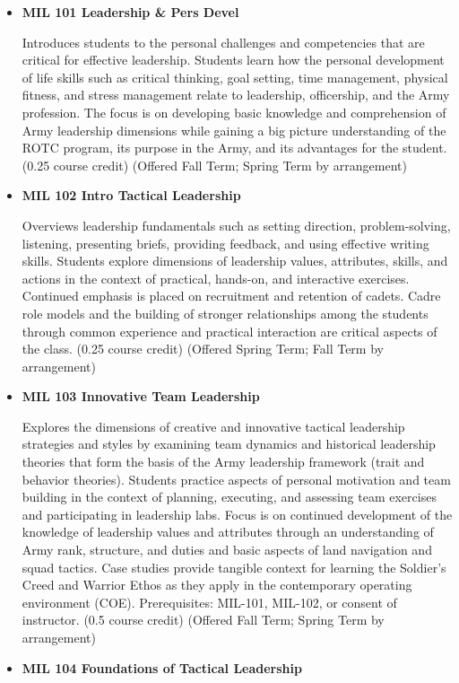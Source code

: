 \documentclass[
  letterpaper,
]{scrbook}
\begin{document}
\begin{itemize}
\item
  \textbf{MIL 101 Leadership \& Pers Devel}

  Introduces students to the personal challenges and competencies that
  are critical for effective leadership. Students learn how the personal
  development of life skills such as critical thinking, goal setting,
  time management, physical fitness, and stress management relate to
  leadership, officership, and the Army profession. The focus is on
  developing basic knowledge and comprehension of Army leadership
  dimensions while gaining a big picture understanding of the ROTC
  program, its purpose in the Army, and its advantages for the student.
  (0.25 course credit) (Offered Fall Term; Spring Term by arrangement)
\item
  \textbf{MIL 102 Intro Tactical Leadership}

  Overviews leadership fundamentals such as setting direction,
  problem-solving, listening, presenting briefs, providing feedback, and
  using effective writing skills. Students explore dimensions of
  leadership values, attributes, skills, and actions in the context of
  practical, hands-on, and interactive exercises. Continued emphasis is
  placed on recruitment and retention of cadets. Cadre role models and
  the building of stronger relationships among the students through
  common experience and practical interaction are critical aspects of
  the class. (0.25 course credit) (Offered Spring Term; Fall Term by
  arrangement)
\item
  \textbf{MIL 103 Innovative Team Leadership}

  Explores the dimensions of creative and innovative tactical leadership
  strategies and styles by examining team dynamics and historical
  leadership theories that form the basis of the Army leadership
  framework (trait and behavior theories). Students practice aspects of
  personal motivation and team building in the context of planning,
  executing, and assessing team exercises and participating in
  leadership labs. Focus is on continued development of the knowledge of
  leadership values and attributes through an understanding of Army
  rank, structure, and duties and basic aspects of land navigation and
  squad tactics. Case studies provide tangible context for learning the
  Soldier's Creed and Warrior Ethos as they apply in the contemporary
  operating environment (COE). Prerequisites: MIL-101, MIL-102, or
  consent of instructor. (0.5 course credit) (Offered Fall Term; Spring
  Term by arrangement)
\item
  \textbf{MIL 104 Foundations of Tactical Leadership}


\end{itemize}
\end{document}
